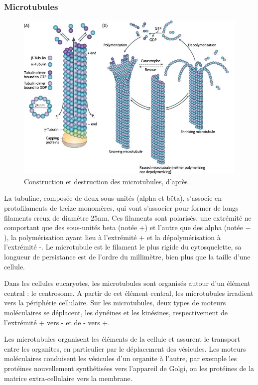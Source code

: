 \subsubsection{Microtubules}

\begin{figure}
\includegraphics[scale=0.5]{Microtubule.png}
\caption{Construction et destruction des microtubules, d'après \cite{huber_emergent_2013}.}
\end{figure}
La tubuline, composée de deux sous-unités (alpha et bêta), s'associe en protofilaments de treize monomères, qui vont s'associer pour former de longs filaments creux de diamètre 25nm. Ces filaments sont polarisés, une extrémité ne comportant que des sous-unités beta (notée +) et l'autre que des alpha (notée $-$ ), la polymérisation ayant lieu à l'extrémité + et la dépolymérisation à l'extrémité -. 
Le microtubule est le filament le plus rigide du cytosquelette, sa longueur de persistance est de l'ordre du millimètre, bien plus que la taille d'une cellule. 

Dans les cellules eucaryotes, les microtubules sont organisés autour d'un élément central : le centrosome. A partir de cet élément central, les microtubules irradient vers la périphérie cellulaire. 
Sur les microtubules, deux types de moteurs moléculaires se déplacent, les dynéines et les kinésines, respectivement de l'extrémité + vers - et de - vers +.  

Les microtubules organisent les éléments de la cellule et assurent le transport entre les organites, en particulier par le déplacement des vésicules. Les moteurs moléculaires conduisent les vésicules d'un organite à l'autre, par exemple les protéines nouvellement synthétisées vers l'appareil de Golgi, ou les protéines de la matrice extra-cellulaire vers la membrane. 

